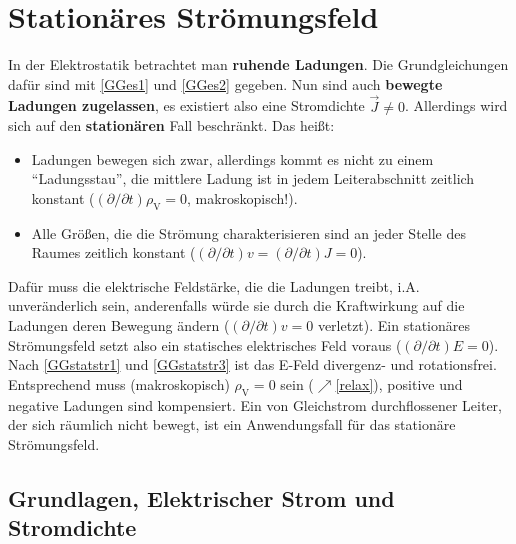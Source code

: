 \chapter{Stationäres Strömungsfeld}\label{statstr}
 In der Elektrostatik betrachtet man \textbf{ruhende Ladungen}. Die Grundgleichungen dafür sind mit \ref{GGes1} und \ref{GGes2} gegeben. Nun sind auch \textbf{bewegte Ladungen zugelassen}, es existiert also eine Stromdichte $\vec{J}\neq 0$. Allerdings wird sich auf den \textbf{stationären} Fall beschränkt. Das heißt:
 \begin{itemize}
 	\item Ladungen bewegen sich zwar, allerdings kommt es nicht zu einem \enquote{Ladungsstau}, die mittlere Ladung ist in jedem Leiterabschnitt zeitlich konstant ($({\partial}/{\partial t}) \rho_\text{V} = 0$, makroskopisch!). 
  \item Alle Größen, die die Strömung charakterisieren sind an jeder Stelle des Raumes zeitlich konstant ($({\partial}/{\partial t})v=({\partial}/{\partial t})J=0$).
  \end{itemize}
  Dafür muss die elektrische Feldstärke, die die Ladungen treibt, i.A. unveränderlich sein, anderenfalls würde sie durch die Kraftwirkung auf die Ladungen deren Bewegung ändern ($({\partial}/{\partial t})v= 0$ verletzt). Ein stationäres Strömungsfeld setzt also ein statisches elektrisches Feld voraus ($({\partial}/{\partial t})E=0$).\\ Nach \ref{GGstatstr1} und \ref{GGstatstr3} ist das E-Feld divergenz- und rotationsfrei. Entsprechend muss (makroskopisch) $\rho_\text{V}=0$ sein ($\nearrow$\ref{relax}), positive und negative Ladungen sind kompensiert. Ein von Gleichstrom durchflossener Leiter, der sich räumlich nicht bewegt, ist ein Anwendungsfall für das stationäre Strömungsfeld.
 \section{Grundlagen, Elektrischer Strom und Stromdichte}
